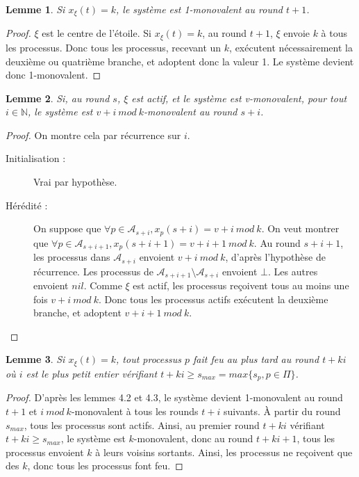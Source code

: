 \documentclass{article}
\newtheorem{lemma}{Lemme}[section]
\begin{document}
\begin{lemma}
	Si $x_\xi(t) = k$, le système est 1-monovalent au round $t+1$.
\end{lemma}
\begin{proof}
	$\xi$ est le centre de l'étoile.
	Si $x_\xi(t) = k$, au round $t+1$, $\xi$ envoie $k$ à tous les processus. Donc tous les processus, recevant un $k$, exécutent nécessairement la deuxième ou quatrième branche,
	et adoptent donc la valeur 1. Le système devient donc 1-monovalent.
\end{proof}

\begin{lemma}
	Si, au round $s$, $\xi$ est actif, et le système est v-monovalent, pour tout $i \in \mathds{N}$, le système est $v+i~mod~k$-monovalent au round $s+i$.
\end{lemma}
\begin{proof}
	On montre cela par récurrence sur $i$.
	\begin{description}
		\item[Initialisation :] Vrai par hypothèse.
		\item[Hérédité :] On suppose que $\forall p \in \mathcal{A}_{s+i}, x_p(s+i) = v+i~mod~k$.
			On veut montrer que $\forall p \in \mathcal{A}_{s+i+1}, x_p(s+i+1) = v+i+1~mod~k$.
			Au round $s+i+1$, les processus dans $\mathcal{A}_{s+i}$ envoient $v+i~mod~k$, d'après l'hypothèse de récurrence.
			Les processus de $\mathcal{A}_{s+i+1} \setminus \mathcal{A}_{s+i}$ envoient $\bot$. Les autres envoient $nil$.
			Comme $\xi$ est actif, les processus reçoivent tous au moins une fois $v+i~mod~k$. Donc tous les processus actifs exécutent la deuxième branche, et adoptent $v+i+1~mod~k$.
	\end{description}
\end{proof}

\begin{lemma}
	Si $x_\xi(t) = k$, tout processus $p$ fait feu au plus tard au round $t+k i$ où $i$ est le plus petit entier vérifiant $t+k i \geq s_{max} = max \{s_p, p \in \Pi\}$.
\end{lemma}
\begin{proof}
	D'après les lemmes 4.2 et 4.3, le système devient 1-monovalent au round $t+1$ et $i~mod~k$-monovalent à tous les rounds $t+i$ suivants.
	À partir du round $s_{max}$, tous les processus sont actifs.
	Ainsi, au premier round $t+k i$ vérifiant $t+k i \geq s_{max}$, le système est $k$-monovalent, donc au round $t+k i +1$, tous les processus envoient $k$ à leurs voisins sortants.
	Ainsi, les processus ne reçoivent que des $k$, donc tous les processus font feu.
\end{proof}
\end{document}

